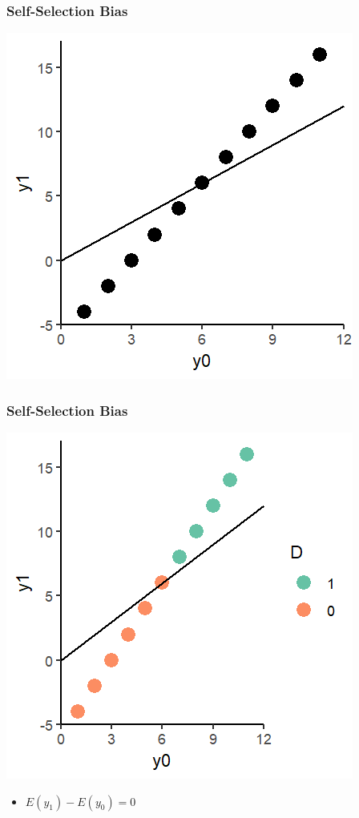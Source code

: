 \documentclass[xcolor=x11names,compress]{beamer}\usepackage[]{graphicx}\usepackage[]{color}
\makeatletter
\def\maxwidth{ %
  \ifdim\Gin@nat@width>\linewidth
    \linewidth
  \else
    \Gin@nat@width
  \fi
}
\newenvironment{knitrout}{}{} %
\renewcommand{\(}{\begin{columns}}
\renewcommand{\)}{\end{columns}}
\newcommand{\<}[1]{\begin{column}{#1}}
\renewcommand{\>}{\end{column}}
\makeatother
\begin{document}
\begin{frame}
\frametitle{Self-Selection Bias}
\begin{knitrout}
\color{fgcolor}
\includegraphics[width=\maxwidth]{figure/SSB1-1} 

\end{knitrout}
\end{frame}

\begin{frame}
\frametitle{Self-Selection Bias}
\begin{knitrout}
\color{fgcolor}
\includegraphics[width=\maxwidth]{figure/SSB2-1} 

\end{knitrout}
\begin{itemize}
\item $E(y_1)-E(y_0)=0$
\end{itemize}
\end{frame}
\end{document}
